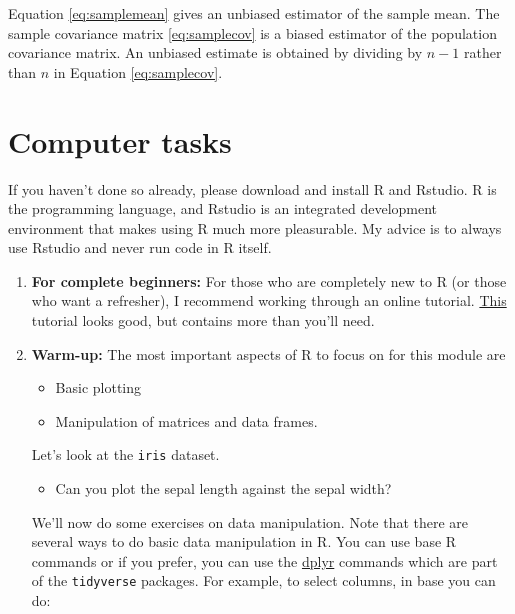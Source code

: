 \documentclass[
]{book}
\providecommand{\tightlist}{%
  \setlength{\itemsep}{0pt}\setlength{\parskip}{0pt}}
\theoremstyle{definition}
\theoremstyle{definition}
\theoremstyle{definition}
\theoremstyle{definition}
\theoremstyle{remark}
\begin{document}
Equation \eqref{eq:samplemean} gives an unbiased estimator of the sample mean. The sample covariance matrix \eqref{eq:samplecov} is a biased estimator of the population covariance matrix. An unbiased estimate is obtained by dividing by \(n-1\) rather than \(n\) in Equation \eqref{eq:samplecov}.

\section{Computer tasks}\label{computer-tasks}

If you haven't done so already, please download and install R and Rstudio. R is the programming language, and Rstudio is an integrated development environment that makes using R much more pleasurable. My advice is to always use Rstudio and never run code in R itself.

\begin{enumerate}
\def\labelenumi{\arabic{enumi}.}
\setcounter{enumi}{-1}
\item
  \textbf{For complete beginners:} For those who are completely new to R (or those who want a refresher), I recommend working through an online tutorial. \href{https://www.statmethods.net/r-tutorial/index.html}{This} tutorial looks good, but contains more than you'll need.
\item
  \textbf{Warm-up:} The most important aspects of R to focus on for this module are

  \begin{itemize}
  \tightlist
  \item
    Basic plotting
  \item
    Manipulation of matrices and data frames.
  \end{itemize}

  Let's look at the \texttt{iris} dataset.

  \begin{itemize}
  \tightlist
  \item
    Can you plot the sepal length against the sepal width?
  \end{itemize}

  We'll now do some exercises on data manipulation. Note that there are several ways to do basic data manipulation in R. You can use base R commands or if you prefer, you can use the \href{https://dplyr.tidyverse.org/}{dplyr} commands which are part of the \texttt{tidyverse} packages.
  For example, to select columns, in base you can do:
\end{enumerate}
\end{document}
